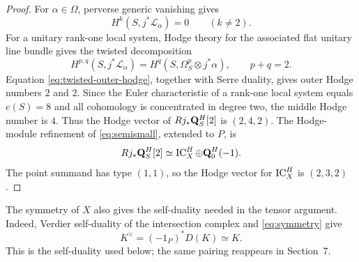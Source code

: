 \begin{proof}
For $\alpha\in\Omega$, perverse generic vanishing
\cite[Theorem~1.1]{KraemerWeissauer2015} gives
\[
 H^k(S,j^*\mathcal L_\alpha)=0\qquad(k\ne2).
\]
For a unitary rank-one local system, Hodge theory for the associated flat
unitary line bundle gives the twisted decomposition
\[
 H^{p,q}(S,j^*\mathcal L_\alpha)
 =H^q(S,\Omega_S^p\otimes j^*\alpha),
 \qquad p+q=2.
\]
Equation \eqref{eq:twisted-outer-hodge}, together with Serre duality, gives
outer Hodge numbers $2$ and $2$.  Since the Euler characteristic of a
rank-one local system equals $e(S)=8$ and all cohomology is concentrated in
degree two, the middle Hodge number is $4$.  Thus the Hodge vector of
$Rj_*\mathbf Q_S^H[2]$ is $(2,4,2)$.  The Hodge-module refinement of
\eqref{eq:semismall}, extended to $P$, is
\[
 Rj_*\mathbf Q_S^H[2]\simeq\operatorname{IC}_X^H\oplus\mathbf Q_0^H(-1).
\]
The point summand has type $(1,1)$, so the Hodge vector for $\operatorname{IC}_X^H$ is
$(2,3,2)$.
\end{proof}

The symmetry of $X$ also gives the self-duality needed in the tensor
argument.  Indeed, Verdier self-duality of the intersection complex and
\eqref{eq:symmetry} give
\begin{equation}
 K^\vee=(-1_P)^*D(K)\simeq K.
\label{eq:self-duality}
\end{equation}
This is the self-duality used below; the same pairing reappears in Section~7.


